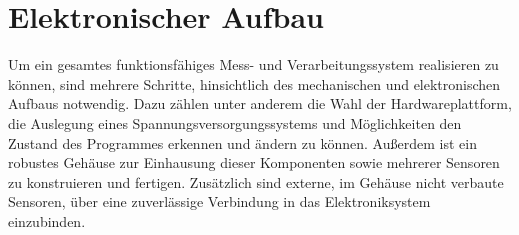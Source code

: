 \section{Elektronischer Aufbau}
\label{sec:Elektronik}
Um ein gesamtes funktionsfähiges Mess- und Verarbeitungssystem realisieren zu können, sind mehrere Schritte, hinsichtlich des mechanischen und elektronischen Aufbaus notwendig. Dazu zählen unter anderem die Wahl der Hardwareplattform, die Auslegung eines Spannungsversorgungssystems und Möglichkeiten den Zustand des Programmes erkennen und ändern zu können. Außerdem ist ein robustes Gehäuse zur Einhausung dieser Komponenten sowie mehrerer Sensoren zu konstruieren und fertigen. Zusätzlich sind externe, im Gehäuse nicht verbaute Sensoren, über eine zuverlässige Verbindung in das Elektroniksystem einzubinden.

